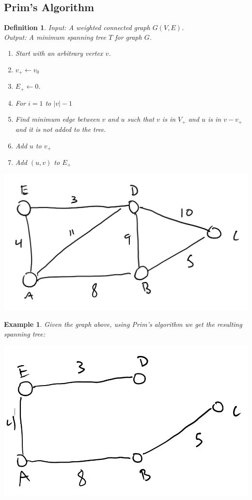 \documentclass{report}
\newtheorem*{ex}{Example}
\newtheorem*{defn}{Definition}
\begin{document}
\subsection{Prim's Algorithm}
\begin{defn}
Input: A weighted connected graph $G(V,E)$.\\
Output: A minimum spanning tree $T$ for graph $G$.
\begin{enumerate}
\item Start with an arbitrary vertex $v$.
\item $v_+ \leftarrow {v_0}$
\item $E_+ \leftarrow 0$.
\item For $i=1$ to $|v|-1$
\item Find minimum edge between $v$ and $u$ such that $v$ is in $V_+$ and $u$ is in $v-v_+$ and it is not added to the tree.
\item Add $u$ to $v_+$
\item Add $(u,v)$ to $E_+$
\end{enumerate}
\end{defn}
\begin{center}
\includegraphics[scale=0.5]{SpanningTreePrim1.png}
\end{center}
\begin{ex}
Given the graph above, using Prim's algorithm we get the resulting spanning tree:
\begin{center}
\includegraphics[scale=0.5]{SpanningTreePrim2.png}
\end{center}
\end{ex}
\end{document}
